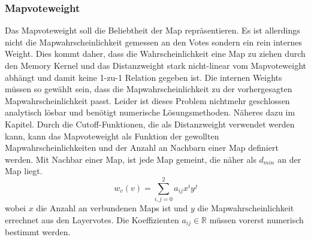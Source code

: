         \subsubsection{Mapvoteweight}
            Das Mapvoteweight soll die Beliebtheit der Map repräsentieren. 
            Es ist allerdings nicht die Mapwahrscheinlichkeit gemessen an den Votes sondern ein rein internes Weight.
            Dies kommt daher, dass die Wahrscheinlichkeit eine Map zu ziehen durch den Memory Kernel und das Distanzweight stark nicht-linear vom Mapvoteweight abhängt und damit keine 1-zu-1 Relation gegeben ist.
            Die internen Weights müssen so gewählt sein, dass die Mapwahrscheinlichkeit zu der vorhergesagten Mapwahrscheinlichkeit passt. 
            Leider ist dieses Problem nichtmehr geschlossen analytisch lösbar und benötigt numerische Lösungsmethoden. 
            Näheres dazu im  Kapitel.
            Durch die Cutoff-Funktionen, die als Distanzweight verwendet werden kann, 
            kann das Mapvoteweight als Funktion der gewollten Mapwahrscheinlichkeiten und der Anzahl an \glqq{}Nachbarn\grqq{} einer Map definiert werden. 
            Mit Nachbar einer Map, ist jede Map gemeint, die näher als $d_{min}$ an der Map liegt. 
            \begin{equation}
                \label{eq:mapweight}
                w_v(v) = \sum_{i,j = 0}^2 a_{ij}x^i y^j
            \end{equation}
            wobei $x$ die Anzahl an verbundenen Maps ist und $y$ die Mapwahrscheinlichkeit errechnet aus den Layervotes.
            Die Koeffizienten $a_{ij}\in\mathbb{R}$ müssen vorerst numerisch bestimmt werden. 
